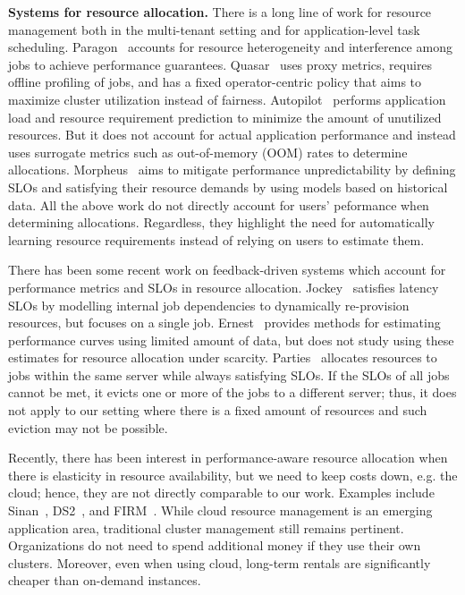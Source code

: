 \textbf{Systems for resource allocation.}
There is a long line of work for resource management both in the multi-tenant setting and for
application-level task scheduling. 
Paragon~\citep{delimitrou2013paragon} accounts for resource heterogeneity and interference
among jobs to achieve performance guarantees.
Quasar~\citep{delimitrou2014quasar} uses proxy metrics, requires
offline profiling of jobs, and has a fixed operator-centric policy that aims to maximize cluster
utilization instead of fairness.
Autopilot~\citep{rzadca2020autopilot} performs application load and resource
requirement prediction to minimize the amount of unutilized resources. But it does not account for
actual application performance and instead uses surrogate metrics such as out-of-memory (OOM) rates
to determine allocations.
Morpheus~\citep{morpheus} aims to mitigate performance unpredictability by
defining SLOs and satisfying their resource demands by using models based on historical data.
All the above work do not directly account for users' peformance when determining
allocations.
Regardless, they highlight the need for automatically learning resource requirements instead of
relying on users to estimate them.

There has been some recent work on feedback-driven systems which account
 for performance metrics and SLOs in resource allocation.
Jockey~\citep{jockey} satisfies latency SLOs by modelling
internal job dependencies to dynamically re-provision resources, but focuses on a single
job.
Ernest~\citep{venkataraman2016ernest} provides methods for estimating performance curves using
limited amount of data, but does not study using these estimates for
resource allocation under scarcity.
Parties~\citep{chen2019parties} 
allocates resources to jobs within the same server while always satisfying SLOs.
If the SLOs of all jobs cannot be met, it evicts one or more of the jobs to a different server;
thus, it does not apply to our setting where there is a fixed amount of
resources and such eviction may not be
possible.


Recently, there has been interest in performance-aware resource allocation when there is elasticity in
resource availability, but we need to keep costs down, e.g. the cloud;
hence, they are not directly comparable to our work.
Examples include Sinan~\citep{zhang2021sinan}, DS2~\citep{kalavri2018three},
and FIRM~\citep{qiu2020firm}.
While cloud resource management is an emerging application area, traditional cluster management
still remains pertinent.
Organizations do not need to spend additional money if they use their own clusters.
Moreover, even when using cloud, long-term rentals are significantly cheaper than on-demand
instances.

